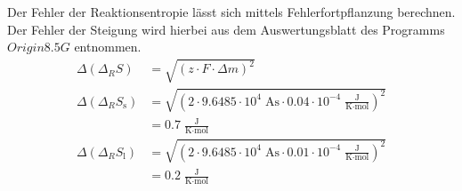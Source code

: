 \documentclass[12pt,a4paper,titlepage,headinclude,bibtotoc]{scrartcl}
\begin{document}
Der Fehler der Reaktionsentropie lässt sich mittels Fehlerfortpflanzung berechnen. Der Fehler der Steigung wird hierbei aus dem Auswertungsblatt des Programms $Origin 8.5 G$ entnommen. 
\begin{align}
\Delta(\Delta_R  S)&= \sqrt{(z\cdot F \cdot \Delta m)^2}\\
\Delta(\Delta_R  S_{\text{s}})&= \sqrt{(2\cdot 9.6485 \cdot 10^4\;\text{As} \cdot 0.04 \cdot 10^{-4}\;\frac{\text{J}}{\text{K}\cdot\text{mol}})^2}\\
&= 0.7 \;\frac{\text{J}}{\text{K}\cdot\text{mol}}\\
\Delta(\Delta_R  S_{\text{l}})&= \sqrt{(2\cdot 9.6485 \cdot 10^4\;\text{As} \cdot 0.01\cdot 10^{-4}\;\frac{\text{J}}{\text{K}\cdot\text{mol}})^2}\\
&= 0.2\;\frac{\text{J}}{\text{K}\cdot\text{mol}}
\end{align}
\end{document}
